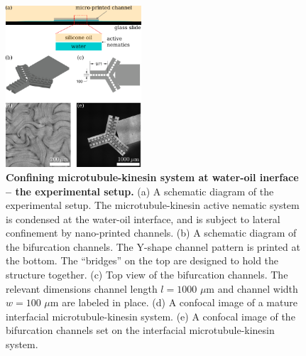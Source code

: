 \documentclass[%
10pt,
superscriptaddress,
twocolumn,
 amsmath,amssymb,
 aps,prx,
]{revtex4-2}
\begin{document}
\begin{figure}[!h]
    \includegraphics[width=0.45\textwidth]{2-bifurcation-experiment}
    \caption{
    \textbf{Confining microtubule-kinesin system at water-oil inerface -- the experimental setup.}
    (a) A schematic diagram of the experimental setup. 
    The microtubule-kinesin active nematic system is condensed at the water-oil interface, and is subject to lateral confinement by nano-printed channels. 
    (b) A schematic diagram of the bifurcation channels. 
    The Y-shape channel pattern is printed at the bottom.
    The ``bridges'' on the top are designed to hold the structure together. 
    (c) Top view of the bifurcation channels. 
    The relevant dimensions channel length $l=1000$ $\mu$m and channel width $w=100$ $\mu$m are labeled in place. 
    (d) A confocal image of a mature interfacial microtubule-kinesin system. 
    (e) A confocal image of the bifurcation channels set on the interfacial microtubule-kinesin system. 
    }
    \label{fig:bifurcation-experiment}
\end{figure}
\end{document}
